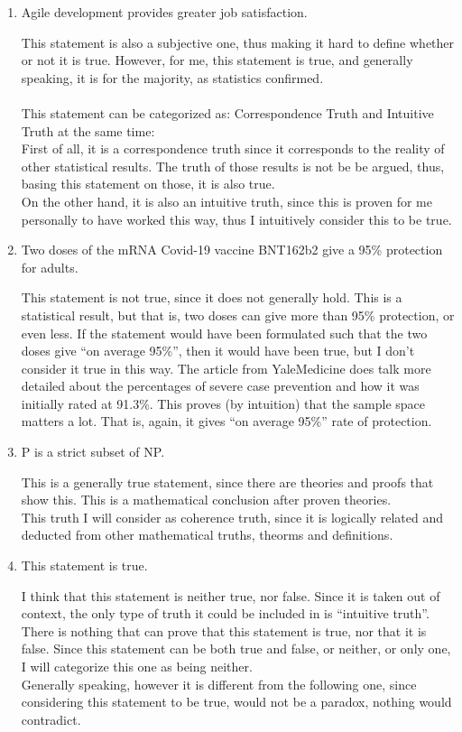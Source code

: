 \documentclass[english]{report}
\begin{document}
\begin{enumerate}
\item Agile development provides greater job satisfaction.

  This statement is also a subjective one, thus making it hard to define whether or not it is true. However, for me, this statement is true, and generally speaking, it is for the majority, as statistics confirmed.
  \\\\
  This statement can be categorized as: Correspondence Truth and Intuitive Truth at the same time:
  \\
  First of all, it is a correspondence truth since it corresponds to the reality of other statistical results. The truth of those results is not be be argued, thus, basing this statement on those, it is also true.
  \\
  On the other hand, it is also an intuitive truth, since this is proven for me personally to have worked this way, thus I intuitively consider this to be true.
  
\item Two doses of the mRNA Covid-19 vaccine BNT162b2 give a 95\% protection for adults.

  This statement is not true, since it does not generally hold. This is a statistical result, but that is, two doses can give more than 95\% protection, or even less. If the statement would have been formulated such that the two doses give ``on average 95\%'', then it would have been true, but I don't consider it true in this way. The article from YaleMedicine \cite{covid} does talk more detailed about the percentages of severe case prevention and how it was initially rated at 91.3\%. This proves (by intuition) that the sample space matters a lot. That is, again, it gives ``on average 95\%'' rate of protection.
  
\item P is a strict subset of NP.

  This is a generally true statement, since there are theories and proofs that show this. This is a mathematical conclusion after proven theories.
  \\
  This truth I will consider as coherence truth, since it is logically related and deducted from other mathematical truths, theorms and definitions. \cite{pnp}
  
\item This statement is true.

  I think that this statement is neither true, nor false. Since it is taken out of context, the only type of truth it could be included in is ``intuitive truth''. There is nothing that can prove that this statement is true, nor that it is false. Since this statement can be both true and false, or neither, or only one, I will categorize this one as being neither.
  \\
  Generally speaking, however it is different from the following one, since considering this statement to be true, would not be a paradox, nothing would contradict.
  

\end{enumerate}
\end{document}
